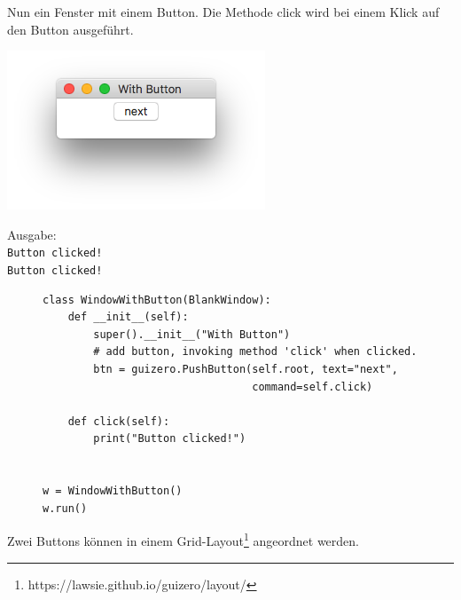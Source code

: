 \documentclass{tufte-handout}
\begin{document}
Nun ein Fenster mit einem Button. Die Methode click wird bei einem Klick auf
den Button ausgeführt.

\begin{marginfigure}[3cm]
	\begin{center}
	\includegraphics[width=\textwidth]{../with_button.png}
	\end{center}
	
	Ausgabe:
	\texttt{\\
Button clicked!\\ 
Button clicked!
}

	
\end{marginfigure}

\begin{figure}
	\begin{lstlisting}
class WindowWithButton(BlankWindow):
    def __init__(self):
        super().__init__("With Button")
        # add button, invoking method 'click' when clicked.
        btn = guizero.PushButton(self.root, text="next", 
                                 command=self.click)

    def click(self):
        print("Button clicked!")


w = WindowWithButton()
w.run()   	\end{lstlisting}
\end{figure} 

\clearpage

Zwei Buttons können in einem
Grid-Layout\footnote{https://lawsie.github.io/guizero/layout/} angeordnet
werden.
\end{document}
